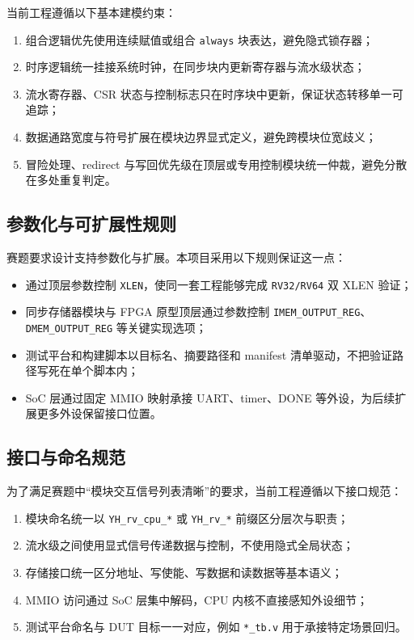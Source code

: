 当前工程遵循以下基本建模约束：
\begin{enumerate}
    \item 组合逻辑优先使用连续赋值或组合 \texttt{always} 块表达，避免隐式锁存器；
    \item 时序逻辑统一挂接系统时钟，在同步块内更新寄存器与流水级状态；
    \item 流水寄存器、CSR 状态与控制标志只在时序块中更新，保证状态转移单一可追踪；
    \item 数据通路宽度与符号扩展在模块边界显式定义，避免跨模块位宽歧义；
    \item 冒险处理、redirect 与写回优先级在顶层或专用控制模块统一仲裁，避免分散在多处重复判定。
\end{enumerate}

\subsection{参数化与可扩展性规则}

赛题要求设计支持参数化与扩展。本项目采用以下规则保证这一点：
\begin{itemize}
    \item 通过顶层参数控制 \texttt{XLEN}，使同一套工程能够完成 \texttt{RV32/RV64} 双 XLEN 验证；
    \item 同步存储器模块与 FPGA 原型顶层通过参数控制 \texttt{IMEM\_OUTPUT\_REG}、
    \texttt{DMEM\_OUTPUT\_REG} 等关键实现选项；
    \item 测试平台和构建脚本以目标名、摘要路径和 manifest 清单驱动，不把验证路径写死在单个脚本内；
    \item SoC 层通过固定 MMIO 映射承接 UART、timer、DONE 等外设，为后续扩展更多外设保留接口位置。
\end{itemize}

\subsection{接口与命名规范}

为了满足赛题中“模块交互信号列表清晰”的要求，当前工程遵循以下接口规范：
\begin{enumerate}
    \item 模块命名统一以 \texttt{YH\_rv\_cpu\_*} 或 \texttt{YH\_rv\_*} 前缀区分层次与职责；
    \item 流水级之间使用显式信号传递数据与控制，不使用隐式全局状态；
    \item 存储接口统一区分地址、写使能、写数据和读数据等基本语义；
    \item MMIO 访问通过 SoC 层集中解码，CPU 内核不直接感知外设细节；
    \item 测试平台命名与 DUT 目标一一对应，例如 \texttt{*\_tb.v} 用于承接特定场景回归。
\end{enumerate}

